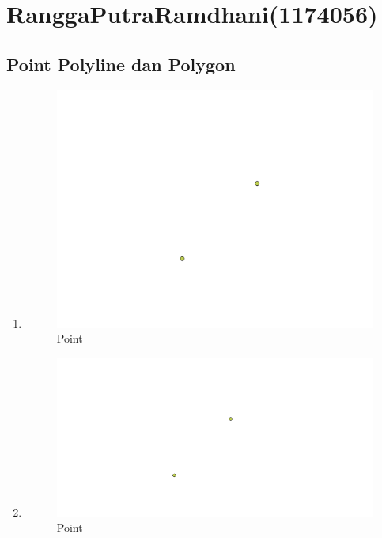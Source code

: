 \section{RanggaPutraRamdhani(1174056)}
\subsection{Point Polyline dan Polygon}
\begin{enumerate}
	\item 
	
	\begin{figure}[H]
		\includegraphics[width=12cm]{figures/1174056/1.PNG}
		\centering
		\caption{Point}
	\end{figure}
	
	\item 
	
	\begin{figure}[H]
		\includegraphics[width=12cm]{figures/1174056/2.PNG}
		\centering
		\caption{Point}
	\end{figure}
	

\end{enumerate}
